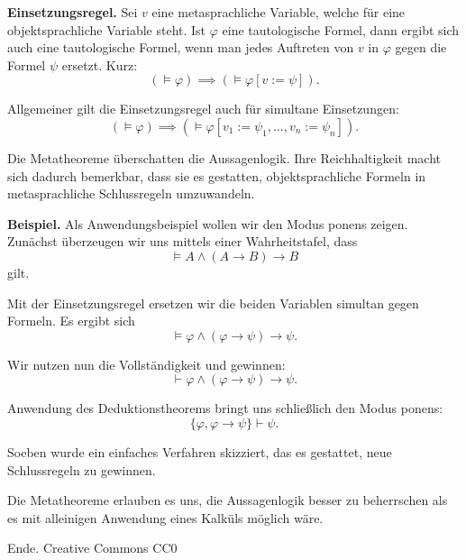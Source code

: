 \documentclass[9pt]{beamer}
\newcommand{\modest}[1]{{\small\color{gray}#1}}
\newcommand{\strong}[1]{\textsf{\textbf{#1}}}
\begin{document}
\begin{frame}
\strong{Einsetzungsregel.} Sei $v$ eine metasprachliche Variable,
welche für eine objektsprachliche Variable steht. Ist $\varphi$
eine tautologische Formel, dann ergibt sich auch eine tautologische
Formel, wenn man jedes Auftreten von $v$ in $\varphi$ gegen die
Formel $\psi$ ersetzt. Kurz:
\[(\models\varphi)\implies (\models\varphi[v:=\psi]).\]
\end{frame}

\begin{frame}
Allgemeiner gilt die Einsetzungsregel auch für simultane Einsetzungen:
\[(\models\varphi)\implies (\models\varphi[v_1:=\psi_1,\ldots,v_n:=\psi_n]).\]
\end{frame}

\begin{frame}
Die Metatheoreme überschatten die Aussagenlogik. Ihre Reichhaltigkeit
macht sich dadurch bemerkbar, dass sie es gestatten,
objektsprachliche Formeln in metasprachliche Schlussregeln
umzuwandeln.
\end{frame}

\begin{frame}
\strong{Beispiel.}
Als Anwendungsbeispiel wollen wir den Modus ponens zeigen.
Zunächst überzeugen wir uns mittels einer Wahrheitstafel, dass
\[\models A\land (A\rightarrow B)\rightarrow B\]
gilt.
\end{frame}

\begin{frame}
Mit der Einsetzungsregel ersetzen wir die beiden Variablen
simultan gegen Formeln. Es ergibt sich
\[\models\varphi\land (\varphi\rightarrow\psi)\rightarrow\psi.\]
\end{frame}

\begin{frame}
Wir nutzen nun die Vollständigkeit und
gewinnen:
\[\vdash\varphi\land (\varphi\rightarrow\psi)\rightarrow\psi.\]
\end{frame}

\begin{frame}
Anwendung des Deduktionstheorems bringt uns schließlich
den Modus ponens:
\[\{\varphi,\varphi\rightarrow\psi\}\vdash\psi.\]
\end{frame}

\begin{frame}
Soeben wurde ein einfaches Verfahren skizziert, das es gestattet, neue
Schlussregeln zu gewinnen.
\end{frame}

\begin{frame}
Die Metatheoreme erlauben es uns, die Aussagenlogik besser
zu beherrschen als es mit alleinigen Anwendung eines Kalküls möglich
wäre.
\end{frame}

\begin{frame}[t]
\vspace{4em}
Ende.
\vfill\hfill
\modest{Creative Commons CC0}
\end{frame}
\end{document}
